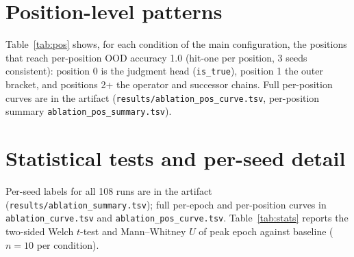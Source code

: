 \documentclass{article} %
\begin{document}
\section{Position-level patterns}
\label{app:pos}

Table~\ref{tab:pos} shows, for each condition of the main
configuration, the positions that reach per-position OOD accuracy
1.0 (hit-one per position, 3 seeds consistent): position 0 is the
judgment head (\texttt{is\_true}), position 1 the outer bracket,
and positions 2+ the operator and successor chains. Full per-position
curves are in the artifact (\texttt{results/ablation\_pos\_curve.tsv},
per-position summary \texttt{ablation\_pos\_summary.tsv}).

\begin{table}[h]
\centering
\small
{}
\caption{Per-position hit-one (whether the position's OOD accuracy
ever reaches 1.0; 1 = yes, 0 = no, consistent across 3 seeds).
Position 0 = judgment head, 1 = outer bracket, 2 = operator,
3+ = successor chains.}
\label{tab:pos}
\end{table}

\section{Statistical tests and per-seed detail}
\label{app:seeds}

Per-seed labels for all 108 runs are in the artifact
(\texttt{results/ablation\_summary.tsv}); full per-epoch and
per-position curves in \texttt{ablation\_curve.tsv} and
\texttt{ablation\_pos\_curve.tsv}. Table~\ref{tab:stats} reports
the two-sided Welch $t$-test and Mann--Whitney $U$ of peak epoch
against baseline ($n = 10$ per condition).
\end{document}
